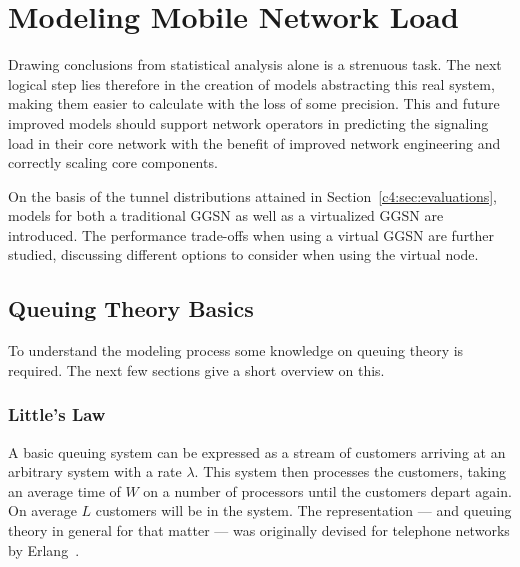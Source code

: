 \section{Modeling Mobile Network Load}
\label{c4:sec:modeling}

Drawing conclusions from statistical analysis alone is a strenuous task. The next logical step lies therefore in the creation of models abstracting this real system, making them easier to calculate with the loss of some precision. This and future improved models should support network operators in predicting the signaling load in their core network with the benefit of improved network engineering and correctly scaling core components.

On the basis of the tunnel distributions attained in Section~\ref{c4:sec:evaluations}, models for both a traditional \gls{GGSN} as well as a virtualized \gls{GGSN} are introduced. The performance trade-offs when using a virtual \gls{GGSN} are further studied, discussing different options to consider when using the virtual node.




\subsection{Queuing Theory Basics}

To understand the modeling process some knowledge on queuing theory is required. The next few sections give a short overview on this.

\subsubsection{Little's Law}

A basic queuing system can be expressed as a stream of customers arriving at an arbitrary system with a rate $\lambda$. This system then processes the customers, taking an average time of $W$ on a number of processors until the customers depart again. On average $L$ customers will be in the system. The representation --- and queuing theory in general for that matter --- was originally devised for telephone networks by Erlang~\cite{erlang1917solution}.

